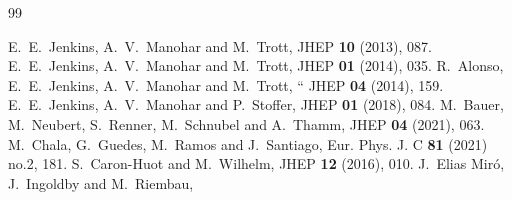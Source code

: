 \documentclass[prl,twocolumn,twoside,preprintnumbers,superscriptaddress, nofootinbib]{revtex4-2}
\begin{document}
\vspace{5pt}

\begin{thebibliography}{99}

E.~E.~Jenkins, A.~V.~Manohar and M.~Trott,
JHEP \textbf{10} (2013), 087.
%
E.~E.~Jenkins, A.~V.~Manohar and M.~Trott,
JHEP \textbf{01} (2014), 035.
%
R.~Alonso, E.~E.~Jenkins, A.~V.~Manohar and M.~Trott,
``%
JHEP \textbf{04} (2014), 159.
%
E.~E.~Jenkins, A.~V.~Manohar and P.~Stoffer,
JHEP \textbf{01} (2018), 084.
%
M.~Bauer, M.~Neubert, S.~Renner, M.~Schnubel and A.~Thamm,
JHEP \textbf{04} (2021), 063.
%
M.~Chala, G.~Guedes, M.~Ramos and J.~Santiago,
Eur. Phys. J. C \textbf{81} (2021) no.2, 181.
%
S.~Caron-Huot and M.~Wilhelm,
JHEP \textbf{12} (2016), 010.
%
J.~Elias Mir\'o, J.~Ingoldby and M.~Riembau,

\end{thebibliography}
\end{document}
